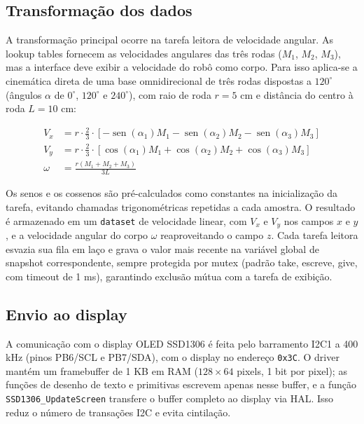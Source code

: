 \documentclass[a4paper,10pt]{article}
\begin{document}
\subsection{Transformação dos dados}

A transformação principal ocorre na tarefa leitora de velocidade angular. As lookup tables fornecem as velocidades angulares das três rodas ($M_1$, $M_2$, $M_3$), mas a interface deve exibir a velocidade do robô como corpo. Para isso aplica-se a cinemática direta de uma base omnidirecional de três rodas dispostas a $120^{\circ}$ (ângulos $\alpha$ de $0^{\circ}$, $120^{\circ}$ e $240^{\circ}$), com raio de roda $r = 5$ cm e distância do centro à roda $L = 10$ cm:

\begin{align*}
V_x &= r \cdot \frac{2}{3} \cdot \left[ -\operatorname{sen}(\alpha_1) M_1 - \operatorname{sen}(\alpha_2) M_2 - \operatorname{sen}(\alpha_3) M_3 \right] \\
V_y &= r \cdot \frac{2}{3} \cdot \left[ \cos(\alpha_1) M_1 + \cos(\alpha_2) M_2 + \cos(\alpha_3) M_3 \right] \\
\omega &= \frac{r \left( M_1 + M_2 + M_3 \right)}{3L}
\end{align*}

Os senos e os cossenos são pré-calculados como constantes na inicialização da tarefa, evitando chamadas trigonométricas repetidas a cada amostra. O resultado é armazenado em um \texttt{dataset} de velocidade linear, com $V_x$ e $V_y$ nos campos $x$ e $y$, e a velocidade angular do corpo $\omega$ reaproveitando o campo $z$. Cada tarefa leitora esvazia sua fila em laço e grava o valor mais recente na variável global de snapshot correspondente, sempre protegida por mutex (padrão take, escreve, give, com timeout de 1 ms), garantindo exclusão mútua com a tarefa de exibição.

\subsection{Envio ao display}

A comunicação com o display OLED SSD1306 é feita pelo barramento I2C1 a 400 kHz (pinos PB6/SCL e PB7/SDA), com o display no endereço \texttt{0x3C}. O driver mantém um framebuffer de 1 KB em RAM ($128 \times 64$ pixels, 1 bit por pixel); as funções de desenho de texto e primitivas escrevem apenas nesse buffer, e a função \texttt{SSD1306\_UpdateScreen} transfere o buffer completo ao display via HAL. Isso reduz o número de transações I2C e evita cintilação.
\end{document}
